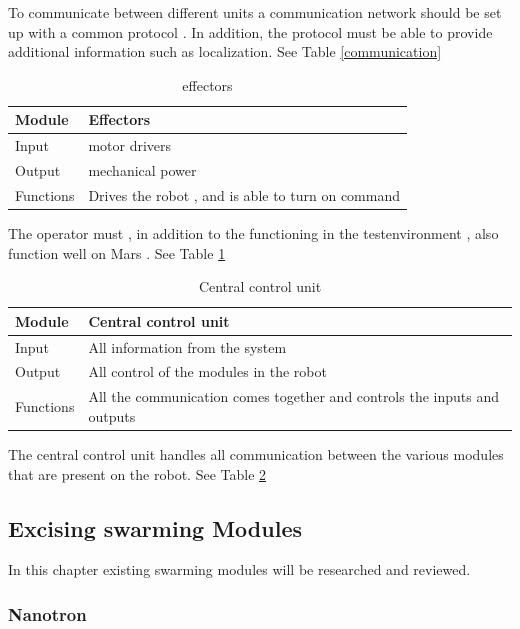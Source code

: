 \documentclass[10pt,a4paper]{article}
\begin{document}
To communicate between different units a communication network should be set up with a common protocol . In addition, the protocol must be able to provide additional information such as localization. See Table \ref{communication} \\

\begin{table}[H]
\centering
\caption{effectors}
\label{Effectors}
\begin{tabular}{|l|l|}
\hline
Module    & Effectors \\ \hline
Input  & motor drivers  \\ \hline
Output & mechanical power   \\ \hline
Functions  & Drives the robot , and is able to turn on command            \\ \hline
\end{tabular}
\end{table}

The operator must , in addition to the functioning in the testenvironment , also function well on Mars . See Table \ref{Effectors} \\

\begin{table}[H]
\centering
\caption{Central control unit}
\label{control}
\begin{tabular}{|l|l|}
\hline
Module    & Central control unit \\ \hline
Input  & All information from the system  \\ \hline
Output & All control of the modules in the robot \\ \hline
Functions  & All the communication comes together and controls the inputs and outputs            \\ \hline
\end{tabular}
\end{table}

The central control unit handles all communication between the various modules that are present on the robot. See Table \ref{control}



\newpage
\subsection{Excising swarming Modules}

In this chapter existing swarming modules will be researched and reviewed.

\subsubsection{Nanotron}
\end{document}
